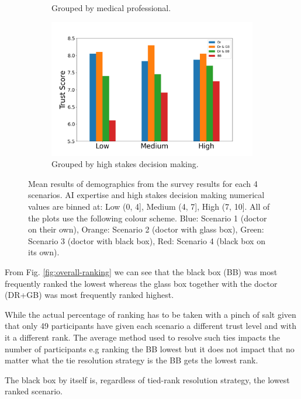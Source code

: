 \documentclass[manuscript,screen,review]{acmart}
\begin{document}
\begin{figure}[ht]
\begin{subfigure}[t]{.45\textwidth}
    \caption{Grouped by medical professional.}
  \end{subfigure}
  \begin{subfigure}[t]{.45\textwidth}
    \centering
    \includegraphics[width=\linewidth]{graphics/survey_averages/survey_stakes_grouped.png}
    \caption{Grouped by high stakes decision making.}
    \label{subfig:high stakes}
  \end{subfigure}
  \caption{Mean results of demographics from the survey results for each 4 scenarios. AI expertise and high stakes decision making numerical values are binned at: Low (0, 4], Medium (4, 7], High (7, 10]. All of the plots use the following colour scheme. Blue: Scenario 1 (doctor on their own), Orange: Scenario 2 (doctor with glass box), Green: Scenario 3 (doctor with black box), Red: Scenario 4 (black box on its own).}
  \label{fig:mean_survey_results}
\end{figure}

From Fig. \ref{fig:overall-ranking} we can see that the black box (BB) was most frequently ranked the lowest whereas the glass box together with the doctor (DR+GB) was most frequently ranked highest.

While the actual percentage of ranking has to be taken with a pinch of salt given that only 49 participants have given each scenario a different trust level and with it a different rank. The average method used to resolve such ties impacts the number of participants e.g ranking the BB lowest but it does not impact that no matter what the tie resolution strategy is the BB gets the lowest rank.

The black box by itself is, regardless of tied-rank resolution strategy, the lowest ranked scenario.
\end{document}
